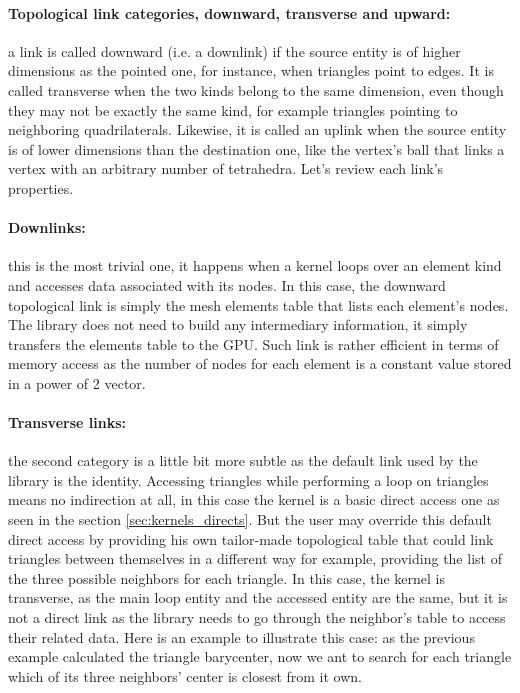 \documentclass[a4paper,12pt]{article}
\begin{document}
\paragraph{Topological link categories, downward, transverse and upward:} a link is called downward (i.e. a downlink) if the source entity is of higher dimensions as the pointed one, for instance, when triangles point to edges. It is called transverse when the two kinds belong to the same dimension, even though they may not be exactly the same kind, for example triangles pointing to neighboring quadrilaterals. Likewise, it is called an uplink when the source entity is of lower dimensions than the destination one, like the vertex's ball that links a vertex with an arbitrary number of tetrahedra. Let's review each link's properties.

\paragraph{Downlinks:} this is the most trivial one, it happens when a kernel loops over an element kind and accesses data associated with its nodes. In this case, the downward topological link is simply the mesh elements table that lists each element's nodes. The library does not need to build any intermediary information, it simply transfers the elements table to the GPU. Such link is rather efficient in terms of memory access as the number of nodes for each element is a constant value stored in a power of 2 vector.

\paragraph{Transverse links:} the second category is a little bit more subtle as the default link used by the library is the identity. Accessing triangles while performing a loop on triangles means no indirection at all, in this case the kernel is a basic direct access one as seen in the section \ref{sec:kernels_directs}. But the user may override this default direct access by providing his own tailor-made topological table that could link triangles between themselves in a different way for example, providing the list of the three possible neighbors for each triangle. In this case, the kernel is transverse, as the main loop entity and the accessed entity are the same, but it is not a direct link as the library needs to go through the neighbor’s table to access their related data. Here is an example to illustrate this case: as the previous example calculated the triangle barycenter, now we ant to search for each triangle which of its three neighbors' center is closest from it own.
\end{document}
